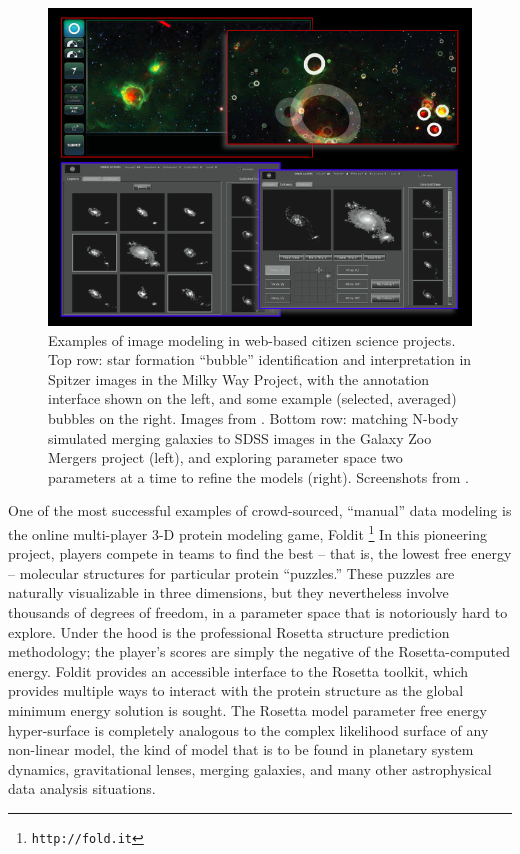 \documentclass{ar2e}
\def\CaseStudy#1{\noindent{\it\bf #1 \,\,\,\,}}
\def\url#1{\texttt{#1}}
\begin{document}
\begin{figure}[!ht]
\centering\includegraphics[width=\linewidth]{figs/modeling.png}
\caption{Examples of image modeling in web-based citizen science projects. Top
row: star formation ``bubble'' identification and interpretation in Spitzer
images in the Milky Way Project, with the annotation interface shown on the
left, and some example (selected, averaged) bubbles on the right. Images from
\citet{Simpson++2012MWP}. Bottom row: matching N-body simulated merging
galaxies to SDSS images in the Galaxy Zoo Mergers project (left), and
exploring parameter space two parameters at a time to refine the models
(right). Screenshots from \citet{HolincheckEtal2010}.}
\label{fig:modeling}
\end{figure}



\CaseStudy{Protein Modeling with Foldit}  
One of the most successful examples of crowd-sourced, ``manual'' data modeling is the
online multi-player 3-D protein modeling game,  Foldit
\citep{Cooper++2010}\footnote{\url{http://fold.it}} In this pioneering
project, players compete in teams to find the best -- that is, the lowest free energy --
molecular structures for particular protein ``puzzles.'' 
These puzzles are naturally visualizable in three dimensions, but 
they nevertheless involve thousands of degrees of freedom, in a parameter
space that is notoriously hard to explore.
Under the hood is the
professional Rosetta structure prediction methodology; the player's scores are
simply the negative of the Rosetta-computed energy. Foldit provides an
accessible interface to the Rosetta toolkit, which provides multiple ways to
interact with the protein structure as the global minimum energy solution is
sought. The Rosetta model parameter free energy hyper-surface is completely analogous
to the complex likelihood surface of any non-linear model, the kind of model
that is to be found in planetary system dynamics, gravitational lenses,
merging galaxies, and many other astrophysical data analysis situations. 
\end{document}
